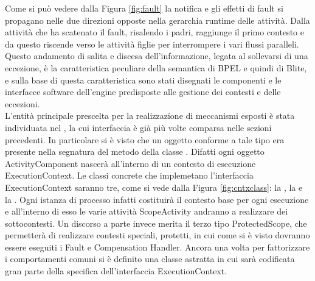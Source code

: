 Come si può vedere dalla Figura \ref{fig:fault} la notifica e gli effetti di
fault si propagano nelle due direzioni opposte nella gerarchia runtime delle
attività. Dalla attività che ha scatenato il fault, risalendo i padri, raggiunge
il primo contesto e da questo riscende verso le attività figlie per
interrompere i vari flussi paralleli. Questo andamento di salita e discesa dell'informazione,
legata al sollevarsi di una eccezione, \`e la caratteristica peculiare della
semantica di BPEL e quindi di Blite, e sulla base di questa caratteristica sono
stati disegnati le componenti e le interfacce software dell'engine predisposte alle
gestione dei contesti e delle eccezioni.
\\

L'entità principale prescelta per la realizzazione di meccanismi esposti \`e
stata individuata nel , la cui interfaccia \`e già più
volte comparsa nelle sezioni precedenti. In particolare si \`e visto che un oggetto
conforme a tale tipo era presente nella segnatura del metodo
 della classe
. Difatti ogni oggetto ActivityComponent
nascerà all'interno di un contesto di esecuzione ExecutionContext.
Le classi concrete che implemetano l'interfaccia ExecutionContext saranno tre,
come si vede dalla Figura \ref{fig:cntxclass}: la ,
la  e la . Ogni istanza di
processo infatti costituirà il contesto base per ogni esecuzione e all'interno
di esso le varie attività ScopeActivity andranno a realizzare dei sottocontesti. Un discorso a
parte invece merita il terzo tipo ProtectedScope, che permetterà di realizzare
contesti speciali, protetti, in cui come si è visto dovranno essere eseguiti i Fault
e Compensation Handler. Ancora una volta per fattorizzare i comportamenti
comuni si \`e definito una classe astratta  in cui sarà
codificata gran parte della specifica dell'interfaccia ExecutionContext.

